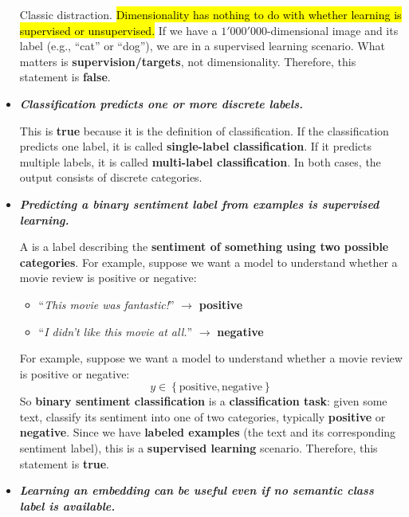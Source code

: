 \begin{itemize}
        Classic distraction. \hl{Dimensionality has nothing to do with whether learning is supervised or unsupervised.} If we have a $1'000'000$-dimensional image and its label (e.g., ``cat'' or ``dog''), we are in a supervised learning scenario. What matters is \textbf{supervision/targets}, not dimensionality. Therefore, this statement is \textbf{false}.

    \item[\textcolor{Green3}{\faIcon{check}}] \textcolor{Green3}{\textbf{\emph{Classification predicts one or more discrete labels.}}}

        This is \textbf{true} because it is the definition of classification. If the classification predicts one label, it is called \textbf{single-label classification}. If it predicts multiple labels, it is called \textbf{multi-label classification}. In both cases, the output consists of discrete categories.

    \item[\textcolor{Green3}{\faIcon{check}}] \textcolor{Green3}{\textbf{\emph{Predicting a binary sentiment label from examples is supervised learning.}}}

        A  is a label describing the \textbf{sentiment of something using two possible categories}. For example, suppose we want a model to understand whether a movie review is positive or negative:
        \begin{itemize}
            \item ``\emph{This movie was fantastic!}'' $\to$ \textbf{positive}
            \item ``\emph{I didn't like this movie at all.}'' $\to$ \textbf{negative}
        \end{itemize}
        For example, suppose we want a model to understand whether a movie review is positive or negative:
        \begin{equation*}
            y \in \left\{\text{positive}, \text{negative}\right\}
        \end{equation*}
        So \textbf{binary sentiment classification} is a \textbf{classification task}: given some text, classify its sentiment into one of two categories, typically \textbf{positive} or \textbf{negative}. Since we have \textbf{labeled examples} (the text and its corresponding sentiment label), this is a \textbf{supervised learning} scenario. Therefore, this statement is \textbf{true}.

    \item[\textcolor{Green3}{\faIcon{check}}] \textcolor{Green3}{\textbf{\emph{Learning an embedding can be useful even if no semantic class label is available.}}}


\end{itemize}
